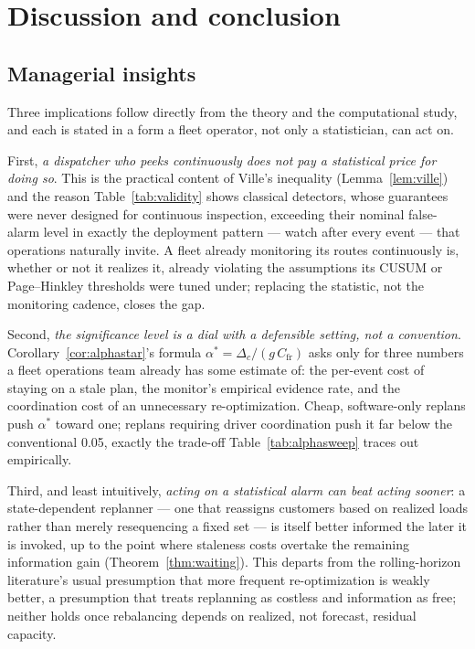 \documentclass[trsc,dblanonrev]{informs4}
\begin{document}
\section{Discussion and conclusion}\label{sec:discussion}

\subsection{Managerial insights}

Three implications follow directly from the theory and the
computational study, and each is stated in a form a fleet operator, not
only a statistician, can act on.

First, \emph{a dispatcher who peeks continuously does not pay a
statistical price for doing so}. This is the practical content of
Ville's inequality (Lemma~\ref{lem:ville}) and the reason
Table~\ref{tab:validity} shows classical detectors, whose guarantees
were never designed for continuous inspection, exceeding their nominal
false-alarm level in exactly the deployment pattern --- watch after
every event --- that operations naturally invite. A fleet already
monitoring its routes continuously is, whether or not it realizes it,
already violating the assumptions its CUSUM or Page--Hinkley
thresholds were tuned under; replacing the statistic, not the
monitoring cadence, closes the gap.

Second, \emph{the significance level is a dial with a defensible
setting, not a convention}. Corollary~\ref{cor:alphastar}'s formula
$\alpha^\ast = \Delta_c/(g\,C_{\mathrm{fr}})$ asks only for three
numbers a fleet operations team already has some estimate of: the
per-event cost of staying on a stale plan, the monitor's empirical
evidence rate, and the coordination cost of an unnecessary
re-optimization. Cheap, software-only replans push $\alpha^\ast$ toward
one; replans requiring driver coordination push it far below the
conventional 0.05, exactly the trade-off Table~\ref{tab:alphasweep}
traces out empirically.

Third, and least intuitively, \emph{acting on a statistical alarm can
beat acting sooner}: a state-dependent replanner --- one that
reassigns customers based on realized loads rather than merely
resequencing a fixed set --- is itself better informed the later it is
invoked, up to the point where staleness costs overtake the remaining
information gain (Theorem~\ref{thm:waiting}). This departs from the
rolling-horizon literature's usual presumption that more frequent
re-optimization is weakly better, a presumption that treats replanning
as costless and information as free; neither holds once rebalancing
depends on realized, not forecast, residual capacity.
\end{document}

